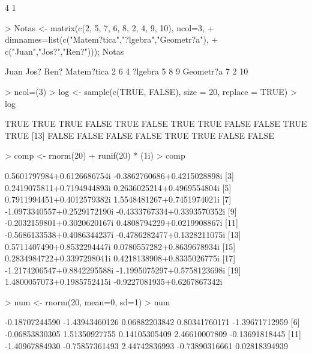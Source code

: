 \documentclass{article}
\begin{document}
\begin{Schunk}
\begin{Soutput}
[1] 4 1
\end{Soutput}
\begin{Sinput}
> Notas <- matrix(c(2, 5, 7, 6, 8, 2, 4, 9, 10), ncol=3,
+                 dimnames=list(c("Matem?tica","?lgebra","Geometr?a"),
+                               c("Juan","Jos?","Ren?"))); Notas
\end{Sinput}
\begin{Soutput}
           Juan Jos? Ren?
Matem?tica    2    6    4
?lgebra       5    8    9
Geometr?a     7    2   10
\end{Soutput}
\begin{Sinput}
> ncol=(3)
> log <- sample(c(TRUE, FALSE), size = 20, replace = TRUE)
> log
\end{Sinput}
\begin{Soutput}
 [1]  TRUE  TRUE  TRUE FALSE  TRUE FALSE  TRUE  TRUE FALSE FALSE  TRUE  TRUE
[13] FALSE FALSE FALSE FALSE  TRUE  TRUE FALSE FALSE
\end{Soutput}
\begin{Sinput}
> comp <- rnorm(20) + runif(20) * (1i)
> comp
\end{Sinput}
\begin{Soutput}
 [1]  0.5601797984+0.6126686754i -0.3862760686+0.4215028898i
 [3]  0.2419075811+0.7194944893i  0.2636025214+0.4969554804i
 [5]  0.7911994451+0.4012579382i  1.5548481267+0.7451974021i
 [7] -1.0973340557+0.2529172190i -0.4333767334+0.3393570352i
 [9] -0.2032159801+0.3020620167i  0.4808794229+0.0219908867i
[11] -0.5686133538+0.4086344237i -0.4786282477+0.1328211075i
[13]  0.5711407490+0.8532294447i  0.0780557282+0.8639678934i
[15]  0.2834984722+0.3397298041i  0.4218138908+0.8335026775i
[17] -1.2174206547+0.8842295588i -1.1995075297+0.5758123698i
[19]  1.4800057073+0.1985752415i -0.9227081935+0.6267867342i
\end{Soutput}
\begin{Sinput}
> num <- rnorm(20, mean=0, sd=1)
> num
\end{Sinput}
\begin{Soutput}
 [1] -0.18707244590 -1.43943460126  0.06882203842  0.80341760171 -1.39671712959
 [6] -0.06853830305  1.51350927755  0.14105305409  2.46610007809 -0.13691818445
[11] -1.40967884930 -0.75857361493  2.44742836993 -0.73890316661  0.02818394939

\end{Soutput}
\end{Schunk}
\end{document}
